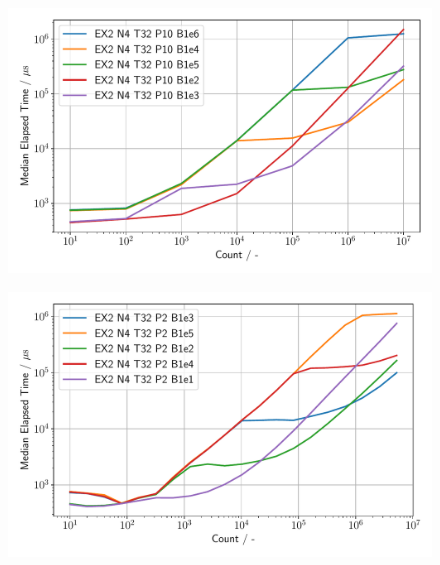 \begin{figure}[h]
\centering
    \begin{minipage}{.5\textwidth}
        \centering
        \includegraphics[width=1.0\linewidth]{figures/Ex2_4.pdf}
        \label{Ex2_4_p}
    \end{minipage}%
    \begin{minipage}{.5\textwidth}
        \centering
        \includegraphics[width=1.0\linewidth]{figures/Ex2_5.pdf}
        \label{Ex2_5_p}
    \end{minipage}
\end{figure}


